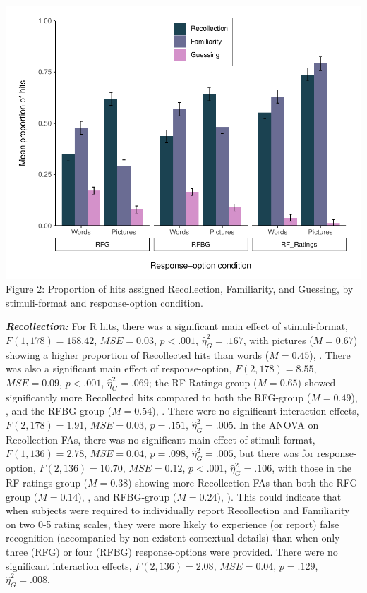 \documentclass[
  11pt,
]{article}
\begin{document}
\includegraphics{R--Thesis_files/figure-latex/unnamed-chunk-13-1.pdf}
Figure 2: Proportion of hits assigned Recollection, Familiarity, and
Guessing, by stimuli-format and response-option condition.

\textbf{\emph{Recollection:}} For R hits, there was a significant main
effect of stimuli-format, \(F(1, 178) = 158.42\),
\(\mathit{MSE} = 0.03\), \(p < .001\), \(\hat{\eta}^2_G = .167\), with
pictures (\(M = 0.67\)) showing a higher proportion of Recollected hits
than words (\(M = 0.45\)), . There was also a significant main effect of
response-option, \(F(2, 178) = 8.55\), \(\mathit{MSE} = 0.09\),
\(p < .001\), \(\hat{\eta}^2_G = .069\); the RF-Ratings group
(\(M = 0.65\)) showed significantly more Recollected hits compared to
both the RFG-group (\(M = 0.49\)), , and the RFBG-group (\(M = 0.54\)),
. There were no significant interaction effects, \(F(2, 178) = 1.91\),
\(\mathit{MSE} = 0.03\), \(p = .151\), \(\hat{\eta}^2_G = .005\). In the
ANOVA on Recollection FAs, there was no significant main effect of
stimuli-format, \(F(1, 136) = 2.78\), \(\mathit{MSE} = 0.04\),
\(p = .098\), \(\hat{\eta}^2_G = .005\), but there was for
response-option, \(F(2, 136) = 10.70\), \(\mathit{MSE} = 0.12\),
\(p < .001\), \(\hat{\eta}^2_G = .106\), with those in the RF-ratings
group (\(M = 0.38\)) showing more Recollection FAs than both the
RFG-group (\(M = 0.14\)), , and RFBG-group (\(M = 0.24\)), ). This could
indicate that when subjects were required to individually report
Recollection and Familiarity on two 0-5 rating scales, they were more
likely to experience (or report) false recognition (accompanied by
non-existent contextual details) than when only three (RFG) or four
(RFBG) response-options were provided. There were no significant
interaction effects, \(F(2, 136) = 2.08\), \(\mathit{MSE} = 0.04\),
\(p = .129\), \(\hat{\eta}^2_G = .008\).
\end{document}
